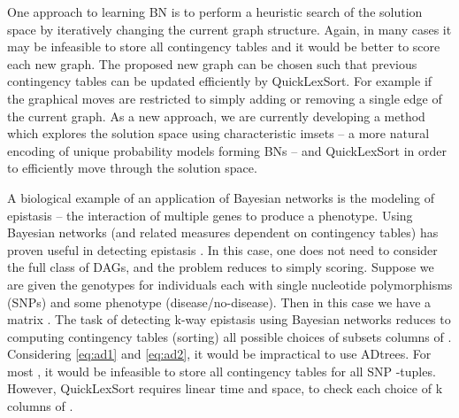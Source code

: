 \documentclass[a4paper,10pt,reqno]{amsart}
\theoremstyle{definition}
\begin{document}
One approach to learning BN is to perform a heuristic search of the solution
space by iteratively changing the current graph
structure\cite{moore2003optimal,madigan1994model,madigan1995bayesian,giudici1999decomposable}. Again, in many cases it may be
infeasible to store all contingency tables and it would be better to score each
new graph. The proposed new graph can be chosen such that previous contingency
tables can be updated efficiently by QuickLexSort. For example if the graphical
moves are restricted to simply adding or removing a single edge of the current
graph.  As a new approach, we are currently developing a method which explores
the solution space using characteristic imsets\cite{hemmecke2012characteristic,studeny2010characteristic,studeny2011polyhedral,StudenyHaws:2013} -- a more natural encoding of unique probability models forming BNs --
and QuickLexSort in order to efficiently move through the solution space.

A biological example of an application of Bayesian networks is the modeling of epistasis --
the interaction of multiple genes to produce a phenotype. Using Bayesian
networks (and related measures dependent on contingency tables) has
proven useful in detecting epistasis
\cite{sucheston2010comparison,jiang2011learning,shang2011performance}.  In this
case, one does not need to consider the full class of DAGs, and the problem
reduces to simply scoring.  Suppose we are given the genotypes for 
individuals each with  single nucleotide polymorphisms (SNPs) and some
phenotype (disease/no-disease). Then in this case we have a matrix .  The task of detecting k-way epistasis using Bayesian
networks reduces to computing contingency tables (sorting) all possible choices
of  subsets columns of .  Considering \autoref{eq:ad1} and
\autoref{eq:ad2}, it would be impractical to use ADtrees.  For most , it
would be infeasible to store all contingency tables for all 
SNP -tuples. However, QuickLexSort requires linear time and space, to check
each choice of k columns of .
\end{document}
